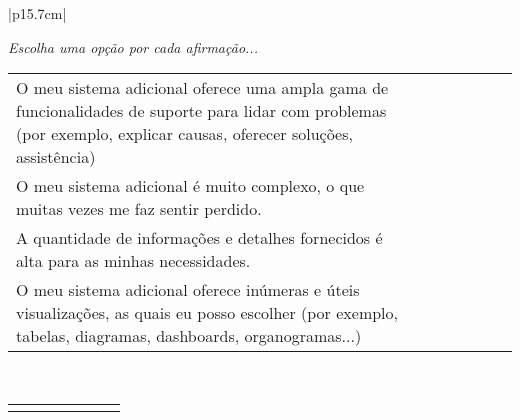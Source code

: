 \begin{longtable}{|p{15.7cm}|}
\begin{Spacing}{2.0}
		\tiny \textit{Escolha uma opção por cada afirmação...} \end{Spacing} 
	\begin{Spacing}{2.0} \end{Spacing}
	\tiny \begin{tabularx}{15.7 cm}{|X|X|X|X|X|X|X|}
	\hline
	& {\rotatebox[origin=c]{90}{\parbox[c]{2.5cm}{\centering \textcolor{white}{.}\newline \medskip Concordo Completamente}}} 
	& {\rotatebox[origin=c]{90}{\parbox[c]{2.5cm}{\centering \textcolor{white}{.}\newline \medskip Concordo Parcialmente}}} 
	& {\rotatebox[origin=c]{90}{\parbox[c]{2.5cm}{\centering \textcolor{white}{.}\newline \medskip Não Concordo \newline Nem Discordo}}}	 
	& {\rotatebox[origin=c]{90}{\parbox[c]{2.5cm}{\centering \textcolor{white}{.}\newline \medskip Discordo  Parcialmente }}} 
	& {\rotatebox[origin=c]{90}{\parbox[c]{2.5cm}{\centering \textcolor{white}{.}\newline \medskip Discordo  Completamente  }}}
	& {\rotatebox[origin=c]{90}{\parbox[c]{2.5cm}{\centering \textcolor{white}{.}\newline  \textcolor{white}{.}\newline Eu Não Sei }}} \\
	\hline
	O meu sistema adicional oferece uma ampla gama de funcionalidades de suporte para lidar com problemas (por exemplo, explicar causas, oferecer soluções, assistência) &   &   &   &   &   &  \\
	\hline
	O meu sistema adicional é muito complexo, o que muitas vezes me faz sentir perdido. &   &   &   &   &   &  \\
	\hline
	A quantidade de informações e detalhes fornecidos é alta para as minhas necessidades. &   &   &   &   &   &  \\
	\hline
	O meu sistema adicional oferece inúmeras e úteis visualizações, as quais eu posso escolher (por exemplo, tabelas, diagramas, dashboards, organogramas...) &   &   &   &   &   &  \\
	\hline
	\end{tabularx}\\
	\tiny \begin{tabularx}{15.7 cm}{|X|X|X|X|X|X|X|}
	\hline
	& {\rotatebox[origin=c]{90}{\parbox[c]{2.5cm}{\centering \textcolor{white}{.}\newline \medskip Concordo Completamente}}} 

\end{tabularx}
\end{longtable}
